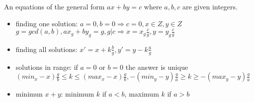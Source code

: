 An equations of the general form $ax + by = c$ where $a, b, c$ are given integers.
\begin{itemize}
    \item 
        finding one solution: $a = 0 , b = 0 \Longrightarrow c = 0, x \in Z , y \in Z$ \\
        $g = gcd(a, b), ax_g + by_g = g, g | c \Longrightarrow x = x_g\frac{c}{g}, y = y_g\frac{c}{g}$
    \item 
        finding all solutions: $x' = x + k\frac{b}{g}, y' = y - k\frac{a}{g}$
    \item 
        solutions in range: if $a = 0$ or $b = 0$ the answer is unique \\ $(min_x - x)\frac{g}{b} \leq k \leq (max_x - x)\frac{g}{b}, -(min_y - y)\frac{g}{a} \geq k \geq -(max_y - y)\frac{g}{a}$
    \item 
        minimun $x + y$: minimum $k$ if $a < b$, maximum $k$ if $a > b$
\end{itemize}
